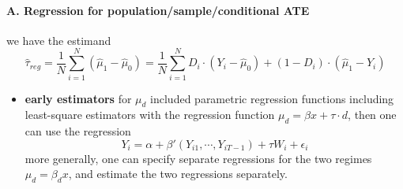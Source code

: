 \documentclass[twoside]{article}
\begin{document}
\paragraph*{A. Regression for population/sample/conditional ATE}
we have the estimand
\begin{equation*}
    \hat{\tau}_{reg} = \frac{1}{N} \sum^N_{i=1}\left(\hat{\mu}_1-\hat{\mu}_0\right) = \frac{1}{N}\sum^N_{i=1}D_i\cdot\left(Y_i - \hat{\mu}_0\right) + (1-D_i)\cdot\left(\hat{\mu}_1-Y_i\right)
\end{equation*}
\begin{itemize}
    \item \textbf{early estimators} for $\mu_d$ included parametric regression functions including least-square estimators with the regression function $\mu_d = \beta x+\tau\cdot d$, then one can use the regression $$ Y_i =\alpha + \beta'\left(Y_{i1},\cdots,Y_{iT-1}\right) + \tau W_i +\epsilon_i $$
    more generally, one can specify separate regressions for the two regimes $\mu_d = \beta_d x$, and estimate the two regressions separately.


\end{itemize}
\end{document}
